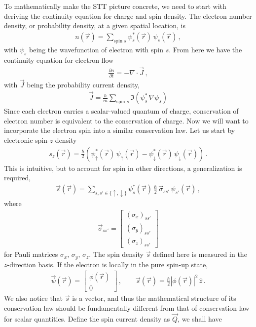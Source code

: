\documentclass[11pt, onesided]{book}
\theoremstyle{break}
\theoremstyle{break}
\newcommand{\pd}{\partial}
\newcommand{\bmat}[1]{\begin{bmatrix} #1 \end{bmatrix}}
\begin{document}
To mathematically make the STT picture concrete, we need to start with deriving the continuity equation for charge and spin density. The electron number density, or probability density, at a given spatial location, is 
\begin{align*}
n(\vec{r}) = \sum_{\text{spin }s} \psi_s^*(\vec{r}) \,\psi_s(\vec{r})\,,
\end{align*}
with $\psi_s$ being the wavefunction of electron with spin $s$. From here we have the continuity equation for electron flow
\begin{align*}
\frac{\pd n}{\pd t} = -\nabla \cdot \vec{J} \,,
\end{align*}
with $\vec{J}$ being the probability current density,
\begin{align*}
\vec{J} = \frac{\hbar}{m} \sum_{\text{spin }s} \Im\left( 
\psi_s^*\, \nabla \psi_s
\right)
\end{align*}
Since each electron carries a scalar-valued quantum of charge, conservation of electron number is equivalent to the conservation of charge. Now we will want to incorporate the electron spin into a similar conservation law. Let us start by electronic spin-$z$ density
\begin{align*}
s_z(\vec{r}) = \frac{\hbar}{2}\left( \psi_{\uparrow}^*(\vec{r}) \,\psi_{\uparrow}(\vec{r}) - \psi_{\downarrow}^*(\vec{r})\,\psi_{\downarrow}(\vec{r})\right)\,.
\end{align*}
This is intuitive, but to account for spin in other directions, a generalization is required, 
\begin{align*}
\vec{s}(\vec{r}) = \sum_{s,s'\in \{\uparrow,\downarrow\}} \psi_s^*(\vec{r}) \, \frac{\hbar}{2}\, \vec{\sigma}_{ss'}\, \psi_{s'}(\vec{r})\,,
\end{align*}
where 
\begin{align*}
\vec{\sigma}_{ss'} = \bmat{(\sigma_x)_{ss'}\\
(\sigma_y)_{ss'}\\
(\sigma_z)_{ss'}
}
\end{align*}
for Pauli matrices $\sigma_x,\,\sigma_y,\,\sigma_z$. The spin density $\vec{s}$ defined here is measured in the $z$-direction basis. If the electron is locally in the pure spin-up state, 
\begin{align*}
\vec{\psi}(\vec{r}) = \bmat{\phi(\vec{r})\\0}\,,\qquad
\vec{s}(\vec{r}) = \frac{\hbar}{2}|\phi(\vec{r})|^2\,\hat{z}\,.
\end{align*}
We also notice that $\vec{s}$ is a vector, and thus the mathematical structure of its conservation law should be fundamentally different from that of conservation law for scalar quantities. Define the spin current density as $\vec{Q}$, we shall have
\end{document}
